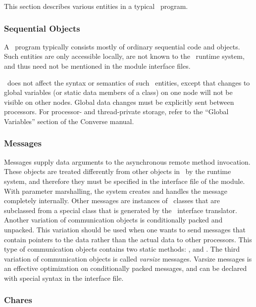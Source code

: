 {This section describes various entities in a typical \charmpp\ program.

\subsubsection{Sequential Objects}

A \charmpp\ program typically consists mostly of ordinary sequential \CC
code and objects. Such entities are only accessible locally, are not known
to the \charmpp\ runtime system, and thus need not be mentioned in the
module interface files. 

\charmpp\ does not affect the syntax or semantics of such \CC\ entities,
except that changes to global variables (or static data members of a class)
on one node will not be visible on other nodes.  Global data changes
must be explicitly sent between processors.  For processor- and
thread-private storage, refer to the ``Global Variables'' section
of the Converse manual.


\subsubsection{Messages}

Messages supply data arguments to the asynchronous remote method invocation.
These objects are treated differently from other objects in \charmpp\ by the
runtime system, and therefore they must be specified in the interface file
of the module.  With parameter marshalling, the system creates and handles
the message completely internally. Other messages are instances of \CC\
classes that are subclassed from a special class that is generated by the
\charmpp\ interface translator.  Another variation of communication objects
is conditionally packed and unpacked. This variation should be used when one
wants to send messages that contain pointers to the data rather than the
actual data to other processors. This type of communication objects contains
two static methods: \kw{pack}, and \kw{unpack}. The third variation of
communication objects is called {\em varsize} messages. Varsize messages is
an effective optimization on conditionally packed messages, and can be
declared with special syntax in the interface file.

\subsubsection{Chares}

}

